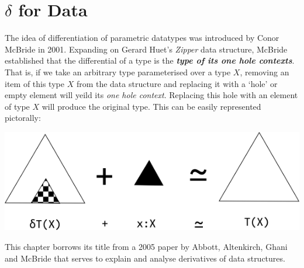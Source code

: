 \documentclass[12pt]{report}
\begin{document}
\chapter{$\delta$ for Data}
The idea of differentiation of parametric datatypes was introduced by Conor McBride in 2001. Expanding on Gerard Huet's \textit{Zipper} data structure\cite{zipper}, McBride established that the differential of a type is the \textbf{\textit{type of its one hole contexts}}. That is, if we take an arbitrary type parameterised over a type $X$, removing an item of this type $X$ from the data structure and replacing it with a `hole' or empty element will yeild its \textit{one hole context}. Replacing this hole with an element of type $X$ will produce the original type. This can be easily represented pictorally:
\begin{center}
\includegraphics[scale=0.6]{5.png}
\end{center} 
This chapter borrows its title from a 2005 paper by Abbott, Altenkirch, Ghani and McBride that serves to explain and analyse derivatives of data structures.
\end{document}
